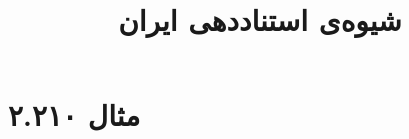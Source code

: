 \documentclass[a4paper,10pt]{article}
\begin{document}
\title{شیوه‌ی استناددهی ایران}
\author{}
\date{}
\maketitle



\section*{مثال ۲.۲۱۰}

\cite{صابری1385}\\
\begin{latin}
\cite{oguinn1987}
\end{latin}






\end{document}

